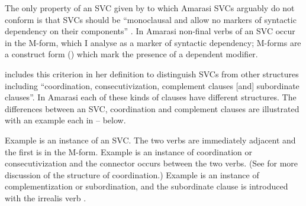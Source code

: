 The only property of an SVC given by \cite{ai06} to which Amarasi
SVCs arguably do not conform is that SVCs should be
``monoclausal and allow no markers of syntactic dependency on their components'' \cite[6]{ai06}.
In Amarasi non-final verbs of an SVC occur in the M-form,
which I analyse as a marker of syntactic dependency;
M-forms are a construct form () which mark the presence
of a dependent modifier.

\cite{ai06} includes this criterion in her definition to distinguish
SVCs from other structures including ``coordination, consecutivization,
complement clauses [and] subordinate clauses''.
In Amarasi each of these kinds of clauses have different structures.
The differences between an SVC, coordination and complement clauses
are illustrated with an example each in -- below.

Example  is an instance of an SVC.
The two verbs are immediately adjacent and the first is in the M-form.
Example  is an instance of coordination
or consecutivization and the connector  occurs between the two verbs.
(See  for more discussion of the structure of coordination.)
Example  is an instance of complementization or subordination,
and the subordinate clause is introduced with the irrealis verb .

\begin{exe}
	\label{ex:SVC}
	\label{ex:130825-6, 0.52}
	\label{ex:130825-6, 21.14}
	\label{ex:130914-1, 1.01}
\end{exe}

